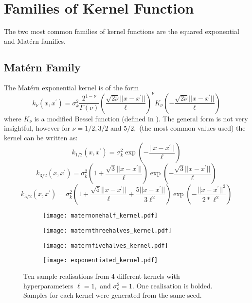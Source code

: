 \color{black}

\section{Families of Kernel Function}

The two most common families of kernel functions are the squared exponential
and Mat\'ern families.

\subsection*{Mat\'{e}rn Family}

The Mat\'ern exponential kernel is of the form
$$k_\nu(x, x^\prime)
    = \sigma^2_k \frac{2^{1 - \nu}}{\Gamma(\nu)}
    \left(\frac{\sqrt{2\nu}||x - x^\prime||}{\ell}\right)^\nu
    K_\nu\left(-\frac{\sqrt{2\nu}||x - x^\prime||}{\ell}\right)$$
where $K_\nu$ is a modified Bessel function
(defined in \cite[374]{abramowitz_handbook_2013}). The general form is not very
insightful, however for $\nu = 1/2, 3/2$ and $5/2,$ (the most common values 
used) the kernel
can be written as:
$$
    k_{1/2}(x, x^\prime)
    = \sigma^2_k\exp\left(-\frac{||x - x^\prime||}{\ell}\right)
$$
$$
    k_{3/2}(x, x^\prime)
    = \sigma^2_k
    \left(1 + \frac{\sqrt{3}||x - x^\prime||}{\ell}\right)
    \exp\left(-\frac{\sqrt{3}||x - x^\prime||}{\ell}\right)
$$
$$
    k_{5/2}(x, x^\prime)
    = \sigma^2_k
    \left(
    1 + \frac{\sqrt{5}||x - x^\prime||}{\ell} + \frac{5||x - x^\prime||}{3\ell^2}
    \right)
    \exp\left(-\frac{||x - x^\prime||^2}{2*\ell^2}\right)
$$

\begin{figure}[htbp]
    \centering
    \begin{subfigure}[b]{0.5\textwidth}
        \centering
        \texttt{[image: maternonehalf\_kernel.pdf]}
        \label{fig:mat_one_half}
    \end{subfigure}%
    \hfill%
    \begin{subfigure}[b]{0.5\textwidth}
        \centering
        \texttt{[image: maternthreehalves\_kernel.pdf]}
        \label{fig:mat_three_halves}
    \end{subfigure}
    \begin{subfigure}[b]{0.5\textwidth}
        \centering
        \texttt{[image: maternfivehalves\_kernel.pdf]}
        \label{fig:mat_five_halves}
    \end{subfigure}%
    \hfill%
    \begin{subfigure}[b]{0.5\textwidth}
        \centering
        \texttt{[image: exponentiated\_kernel.pdf]}
        \label{fig:squared_exp}
    \end{subfigure}%
    \caption{
        Ten sample realisations from 4 different kernels with hyperparameters
        $\ell = 1,$ and $\sigma^2_o = 1.$ One realisation is bolded. Samples
        for each kernel were generated from the same seed.
    }
    \label{fig:kernels}
\end{figure}

